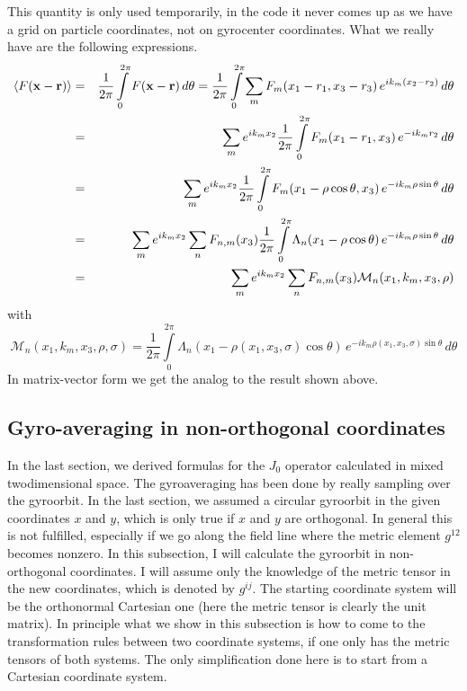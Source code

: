 This quantity is only used temporarily, in the code it never comes up
as we have a grid on particle coordinates, not on gyrocenter
coordinates. What we really have are the following expressions.
\begin{eqnarray*}
  \left\langle F(\mathbf{x}-\mathbf{r}) \right\rangle 
  &=& \frac{1}{2\pi}\int\limits_0^{2\pi} F(\mathbf{x}-\mathbf{r})\,d\theta
  = \frac{1}{2\pi}\int\limits_0^{2\pi} \sum_m
  F_m(x_1-r_1,x_3-r_3)\,e^{ik_m(x_2-r_2)}\,d\theta\\
  &=& \sum_m e^{ik_mx_2} \frac{1}{2\pi}\int\limits_0^{2\pi} 
  F_m(x_1-r_1,x_3)\,e^{-ik_m r_2}\,d\theta\\
  &=& \sum_m e^{ik_mx_2} \frac{1}{2\pi}\int\limits_0^{2\pi} 
  F_m(x_1-\rho\cos\theta,x_3)\,e^{-ik_m \rho\sin\theta}\,d\theta\\
  &=& \sum_m e^{ik_mx_2} \sum_n F_{n,m}(x_3) \frac{1}{2\pi}\int\limits_0^{2\pi} 
  \Lambda_n(x_1-\rho\cos\theta)\,e^{-ik_m \rho\sin\theta}\,d\theta\\
  &=& \sum_m e^{ik_mx_2} \sum_n F_{n,m}(x_3) \mathcal{M}_{n}(x_1,k_m,x_3,\rho)\\
\end{eqnarray*}
with 
\begin{displaymath}
  \mathcal{M}_{n}(x_1,k_m,x_3,\rho,\sigma)=\frac{1}{2\pi}\int\limits_0^{2\pi} 
  \Lambda_n(x_1-\rho(x_1,x_3,\sigma)\cos\theta)\,e^{-ik_m \rho(x_1,x_3,\sigma)\sin\theta}\,d\theta
\end{displaymath}
In matrix-vector form we get the analog to the result shown above.


\subsection{Gyro-averaging in non-orthogonal coordinates}
In the last section, we derived formulas for the $J_0$ operator
calculated in mixed twodimensional space. The gyroaveraging 
has been done by really sampling over the gyroorbit. In the last
section, we assumed a circular gyroorbit in the given coordinates $x$
and $y$, which is only true if $x$ and $y$ are orthogonal. In general
this is not fulfilled, especially if we go along the field line where
the metric element $g^{12}$ becomes nonzero. In this subsection, I
will calculate the gyroorbit in non-orthogonal coordinates. I will
assume only the knowledge of the metric tensor in the new coordinates,
which is denoted by $g^{ij}$. The starting coordinate system will
be the orthonormal Cartesian one (here the metric tensor is clearly
the unit matrix). In principle what we show in this subsection is how
to come to the transformation rules between two coordinate systems, if
one only has the metric tensors of both systems. The only
simplification done here is to start from a Cartesian coordinate system.

